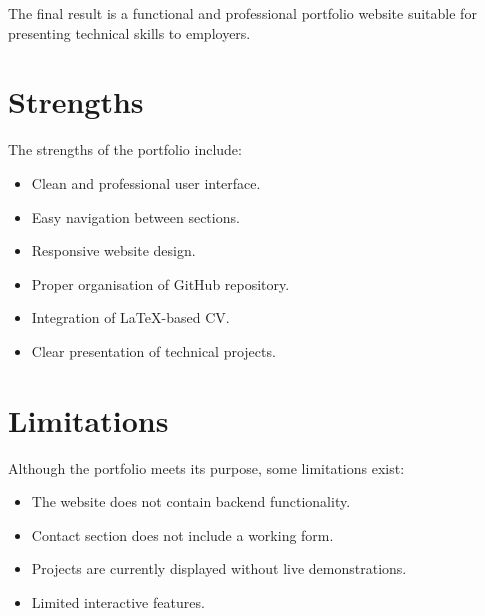 \documentclass[12pt,a4paper]{article}
\begin{document}
The final result is a functional and professional portfolio website suitable for presenting technical skills to employers.



\section{Strengths}


The strengths of the portfolio include:


\begin{itemize}


\item Clean and professional user interface.

\item Easy navigation between sections.

\item Responsive website design.

\item Proper organisation of GitHub repository.

\item Integration of LaTeX-based CV.

\item Clear presentation of technical projects.


\end{itemize}





\section{Limitations}


Although the portfolio meets its purpose, some limitations exist:


\begin{itemize}


\item The website does not contain backend functionality.

\item Contact section does not include a working form.

\item Projects are currently displayed without live demonstrations.

\item Limited interactive features.


\end{itemize}
\end{document}
